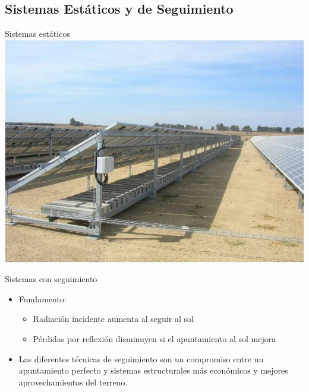\documentclass[xcolor={usenames,svgnames,dvipsnames}]{beamer}
\begin{document}
\subsection{Sistemas Estáticos y de Seguimiento}
\label{sec-2-1}
\begin{frame}[label=sec-2-1-1]{Sistemas estáticos}
\includegraphics[width=.9\linewidth]{../figs/EstructuraEstaticaSuelo.jpg}
\end{frame}

\begin{frame}[label=sec-2-1-2]{Sistemas con seguimiento}
\begin{itemize}
\item \alert{Fundamento:}

\begin{itemize}
\item Radiación incidente aumenta al seguir al sol

\item Pérdidas por reflexión disminuyen si el apuntamiento al sol mejora
\end{itemize}

\item Las diferentes técnicas de seguimiento son un compromiso entre un
apuntamiento perfecto y sistemas estructurales más económicos y
mejores aprovechamientos del terreno.
\end{itemize}
\end{frame}
\end{document}
